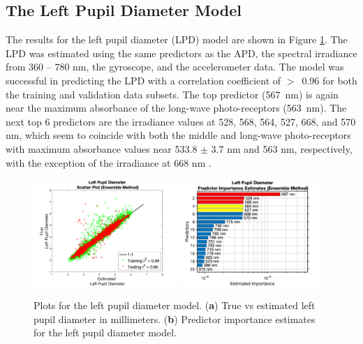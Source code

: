 \documentclass[10pt]{article}
\begin{document}
\subsection{The Left Pupil Diameter Model}

The results for the left pupil diameter (LPD) model are shown in Figure \ref{fig:LPD}. The LPD was estimated using the same predictors as the APD, the spectral irradiance from 360 -- 780 nm, the gyroscope, and the accelerometer data. The model was successful in predicting the LPD with a correlation coefficient of \hbox{$>$ 0.96} for both the training and validation data subsets. The top predictor (\hbox{567 nm}) is again near the maximum absorbance of the long-wave photo-receptors (\hbox{563 nm}). The next top 6 predictors are the irradiance values at 528, 568, 564, 527, 668, and 570 nm, which seem to coincide with both the middle and long-wave photo-receptors with maximum absorbance values near 533.8 $\pm$ 3.7 nm and 563 nm, respectively, with the exception of the irradiance at 668 nm \cite{BowmakerCones}.

\begin{figure}[!b]
  \centering
  \includegraphics[width=0.48\textwidth]{./scatterPlots/LeftPupilDiameter_Ensemble_Scatter2.png}\label{fig:LPDa}
  \hfill
  \includegraphics[width=0.48\textwidth]{./importanceRankings/LeftPupilDiameterEnsembleImpRankT20.png}\label{fig:LPDb}
  \caption{Plots for the left pupil diameter model. (\textbf{a}) True vs estimated left pupil diameter in millimeters. (\textbf{b}) Predictor importance estimates for the left pupil diameter model.
  \label{fig:LPD}
  }
\end{figure}
\end{document}
